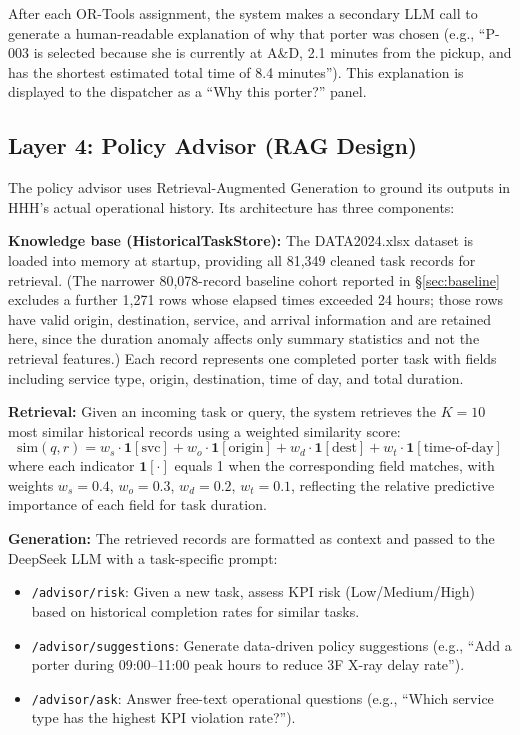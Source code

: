 \documentclass[12pt,a4paper]{article}
\begin{document}
After each OR-Tools assignment, the system makes a secondary LLM call to generate a human-readable explanation of why that porter was chosen (e.g., ``P-003 is selected because she is currently at A\&D, 2.1 minutes from the pickup, and has the shortest estimated total time of 8.4 minutes''). This explanation is displayed to the dispatcher as a ``Why this porter?'' panel.

\subsection{Layer 4: Policy Advisor (RAG Design)}

The policy advisor uses Retrieval-Augmented Generation \cite{lewis2020} to ground its outputs in HHH's actual operational history. Its architecture has three components:

\textbf{Knowledge base (HistoricalTaskStore):} The DATA2024.xlsx dataset is loaded into memory at startup, providing all 81,349 cleaned task records for retrieval. (The narrower 80,078-record baseline cohort reported in \S\ref{sec:baseline} excludes a further 1,271 rows whose elapsed times exceeded 24 hours; those rows have valid origin, destination, service, and arrival information and are retained here, since the duration anomaly affects only summary statistics and not the retrieval features.) Each record represents one completed porter task with fields including service type, origin, destination, time of day, and total duration.

\textbf{Retrieval:} Given an incoming task or query, the system retrieves the $K=10$ most similar historical records using a weighted similarity score:
\begin{equation}
\text{sim}(q, r) = w_s \cdot \mathbf{1}[\text{svc}] + w_o \cdot \mathbf{1}[\text{origin}] + w_d \cdot \mathbf{1}[\text{dest}] + w_t \cdot \mathbf{1}[\text{time-of-day}]
\end{equation}
where each indicator $\mathbf{1}[\cdot]$ equals 1 when the corresponding field matches, with weights $w_s = 0.4$, $w_o = 0.3$, $w_d = 0.2$, $w_t = 0.1$, reflecting the relative predictive importance of each field for task duration.

\textbf{Generation:} The retrieved records are formatted as context and passed to the DeepSeek LLM with a task-specific prompt:
\begin{itemize}
  \item \texttt{/advisor/risk}: Given a new task, assess KPI risk (Low/Medium/High) based on historical completion rates for similar tasks.
  \item \texttt{/advisor/suggestions}: Generate data-driven policy suggestions (e.g., ``Add a porter during 09:00--11:00 peak hours to reduce 3F X-ray delay rate'').
  \item \texttt{/advisor/ask}: Answer free-text operational questions (e.g., ``Which service type has the highest KPI violation rate?'').
\end{itemize}
\end{document}
